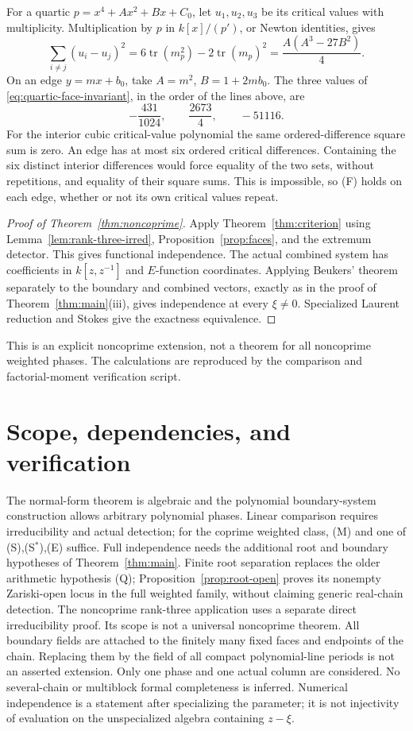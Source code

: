 \documentclass[11pt]{article}
\numberwithin{equation}{section}
\theoremstyle{definition}
\theoremstyle{remark}
\begin{document}
For a quartic $p=x^4+Ax^2+Bx+C_0$, let $u_1,u_2,u_3$ be its critical
values with multiplicity. Multiplication by $p$ in $k[x]/(p')$, or Newton
identities, gives
\begin{equation}\label{eq:quartic-face-invariant}
 \sum_{i\ne j}(u_i-u_j)^2
 =6\operatorname{tr}(m_p^2)-2\operatorname{tr}(m_p)^2
 =\frac{A(A^3-27B^2)}4.
\end{equation}
On an edge $y=mx+b_0$, take $A=m^2$, $B=1+2mb_0$. The three values of
\eqref{eq:quartic-face-invariant}, in the order of the lines above, are
\[
 -\frac{431}{1024},\qquad \frac{2673}{4},\qquad -51116.
\]
For the interior cubic critical-value polynomial the same ordered-difference
square sum is zero. An edge has at most six ordered critical differences.
Containing the six distinct interior differences would force equality of
the two sets, without repetitions, and equality of their square sums.
This is impossible, so (F) holds on each edge, whether or not its own
critical values repeat.

\begin{proof}[Proof of Theorem~\ref{thm:noncoprime}]
Apply Theorem~\ref{thm:criterion} using Lemma~\ref{lem:rank-three-irred},
Proposition~\ref{prop:faces}, and the extremum detector. This gives functional
independence. The actual combined system has coefficients in $k[z,z^{-1}]$
and $E$-function coordinates. Applying Beukers' theorem separately to the
boundary and combined vectors, exactly as in the proof of
Theorem~\ref{thm:main}(iii), gives independence at every $\xi\ne0$.
Specialized Laurent reduction and Stokes give the exactness equivalence.
\end{proof}

This is an explicit noncoprime extension, not a theorem for all noncoprime
weighted phases. The calculations are reproduced by the comparison and
factorial-moment verification script.

\section{Scope, dependencies, and verification}\label{sec:scope}
The normal-form theorem is algebraic and the polynomial boundary-system
construction allows arbitrary polynomial phases. Linear comparison requires
irreducibility and actual detection; for the coprime weighted class, (M)
and one of (S),(S$^*$),(E) suffice. Full independence needs the additional
root and boundary hypotheses of Theorem~\ref{thm:main}. Finite root separation
replaces the older arithmetic hypothesis (Q); Proposition~\ref{prop:root-open}
proves its nonempty Zariski-open locus in the full weighted family, without
claiming generic real-chain detection. The noncoprime rank-three application
uses a separate direct irreducibility proof. Its scope is not a universal
noncoprime theorem.
All boundary fields are attached to the finitely many fixed faces and
endpoints of the chain. Replacing them by the field of all compact
polynomial-line periods is not an asserted extension. Only one phase and
one actual column are considered. No several-chain or multiblock formal
completeness is inferred. Numerical independence is a statement after
specializing the parameter; it is not injectivity of evaluation on the
unspecialized algebra containing $z-\xi$.
\end{document}
